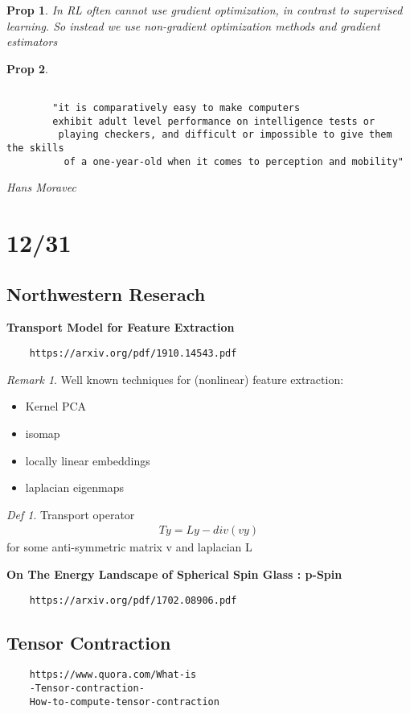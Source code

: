 \documentclass[11pt]{article}
\newtheorem{prop}{Prop}
\theoremstyle{remark}
\newtheorem{remark}{Remark}
\newtheorem{defi}{Def}
\begin{document}
\begin{prop}
	In RL often cannot use gradient optimization, in contrast to supervised learning. So instead we use non-gradient optimization methods and gradient estimators
\end{prop}

\begin{prop}

	\begin{verbatim}

		"it is comparatively easy to make computers 
		exhibit adult level performance on intelligence tests or
		 playing checkers, and difficult or impossible to give them the skills
		  of a one-year-old when it comes to perception and mobility"
	\end{verbatim}
	Hans Moravec
\end{prop}

\section{12/31}

\subsection{Northwestern Reserach}

\textbf{Transport Model for Feature Extraction}

\begin{verbatim}
	https://arxiv.org/pdf/1910.14543.pdf
\end{verbatim}

\begin{remark}
	Well known techniques for (nonlinear) feature extraction:
	\begin{itemize}
		\item Kernel PCA
		\item isomap
		\item locally linear embeddings
		\item laplacian eigenmaps
	\end{itemize}
\end{remark}

\begin{defi}
	Transport operator
	\begin{align*}
		Ty = Ly - div(vy)
	\end{align*}
	for some anti-symmetric matrix v and laplacian L
\end{defi}

\textbf{On The Energy Landscape of Spherical Spin Glass : p-Spin}

\begin{verbatim}
	https://arxiv.org/pdf/1702.08906.pdf
\end{verbatim}



\subsection{Tensor Contraction}

\begin{verbatim}
	https://www.quora.com/What-is
	-Tensor-contraction-
	How-to-compute-tensor-contraction
\end{verbatim}
\end{document}
